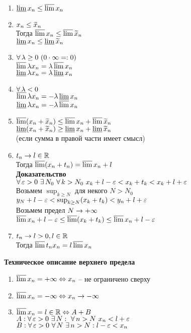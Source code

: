\documentclass[12pt]{article}
\begin{document}
\begin{enumerate}
    \item $\dlim x_n \leq \ulim x_n$
    \item $x_n \leq \ot x_n$\\
    Тогда $\ulim x_n \leq \ulim \ot x_n$\\
    $\dlim x_n \leq \dlim \ot x_n$
    \item $\fall \lambda \geq 0\ (0\cdot \infty =: 0)$\\
    $\ulim \lambda x_n = \lambda \ulim x_n$\\
    $\dlim \lambda x_n = \lambda \dlim x_n$
    \item $\fall \lambda < 0 $\\
    $\ulim \lambda x_n = -\lambda \dlim x_n$\\
    $\dlim \lambda x_n = -\lambda \ulim x_n$
    \item $\ulim (x_n + \ot x_n) \leq \ulim x_n + \ulim \ot x_n$\\
    $\dlim (x_n + \ot x_n) \geq \dlim x_n + \dlim \ot x_n$\\
    (если сумма в правой части имеет смысл)
    \item $t_n \rto l \in \Rset$\\
    Тогда $\ulim (x_n + t_n) = \ulim x_n + l$\\
    \textbf{Доказательство}\\
    $\fall \eps > 0\ \ex N_0\ \fall k > N_0\ x_k + l - \eps < x_k + t_k < x_k + l + \eps$\\
    Возьмем $\sup_{k \geq N}$ для некого $N > N_0$\\
    $y_N + l - \eps < \sup_{k \geq N} (x_k + t_k) < y_n + l + \eps$\\
    Возьмем предел $N \rto +\infty$\\
    $\ulim x_n + l - \eps \leq \ulim (x_k + t_k) \leq \ulim x_n + l - \eps$
    \item $t_n \rto l>0, l \in \Rset$\\
    Тогда $\ulim t_nx_n = l\ulim x_n$
\end{enumerate}
\textbf{Техническое описание верхнего предела}
\begin{enumerate}
    \item $\ulim x_n = +\infty \LRto x_n$ -- не ограничено сверху
    \item $\ulim x_n = -\infty \LRto x_n \rto -\infty$
    \item $\ulim x_n = l \in \Rset \LRto A + B$\\
    $A: \fall \eps > 0\ \ex N:\ \fall n > N\ x_n < l + \eps$\\
    $B: \fall \eps > 0\ \fall N\ \ex n > N: l-\eps < x_n$
\end{enumerate}
\end{document}
